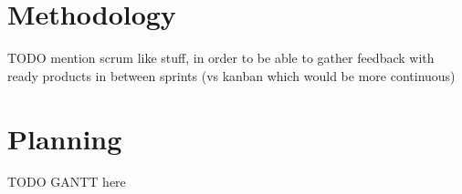 \section{Methodology}

TODO
mention scrum like stuff, in order to be able to gather feedback with ready products in between sprints (vs kanban which would be more continuous)

\section{Planning}

TODO
GANTT here
